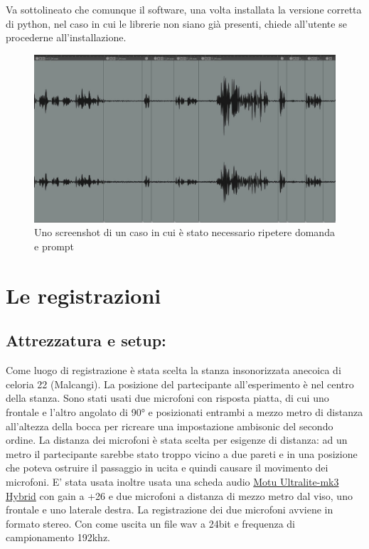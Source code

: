 \documentclass[
]{article}
\begin{document}
Va sottolineato che comunque il software, una volta installata la versione corretta di python, nel caso in cui le librerie non siano già presenti, chiede all'utente se procederne all'installazione.

\begin{figure}
\centering
\includegraphics{img/1.jpg}
\caption{Uno screenshot di un caso in cui è stato necessario ripetere domanda e prompt}
\end{figure}

\section{Le registrazioni}\label{le-registrazioni}

\subsection{Attrezzatura e setup:}\label{attrezzatura-e-setup}

Come luogo di registrazione è stata scelta la stanza insonorizzata anecoica di celoria 22 (Malcangi). La posizione del partecipante all'esperimento è nel centro della stanza. Sono stati usati due microfoni con risposta piatta, di cui uno frontale e l'altro angolato di 90° e posizionati entrambi a mezzo metro di distanza all'altezza della bocca per ricreare una impostazione ambisonic del secondo ordine. La distanza dei microfoni è stata scelta per esigenze di distanza: ad un metro il partecipante sarebbe stato troppo vicino a due pareti e in una posizione che poteva ostruire il passaggio in ucita e quindi causare il movimento dei microfoni. E' stata usata inoltre usata una scheda audio \href{https://motu.com/products/motuaudio/ultralite-mk3/i-o.html}{Motu Ultralite-mk3 Hybrid} con gain a +26 e due microfoni a distanza di mezzo metro dal viso, uno frontale e uno laterale destra. La registrazione dei due microfoni avviene in formato stereo. Con come uscita un file wav a 24bit e frequenza di campionamento 192khz.
\end{document}
